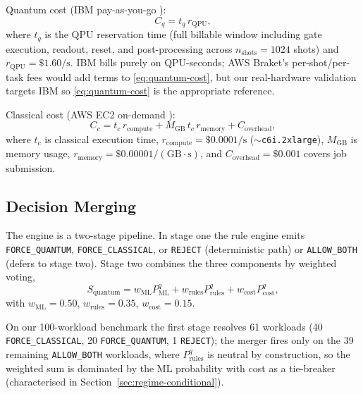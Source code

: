 \documentclass[10pt,conference]{IEEEtran}
\begin{document}
Quantum cost (IBM pay-as-you-go \cite{ibm_pricing2024}):
\begin{equation}
C_q = t_q\, r_{\text{QPU}},
\label{eq:quantum-cost}
\end{equation}
where $t_q$ is the QPU reservation time (full billable window including gate execution, readout, reset, and post-processing across $n_{\text{shots}}{=}1024$ shots) and $r_{\text{QPU}}{=}\$1.60/\text{s}$. IBM bills purely on QPU-seconds; AWS Braket's per-shot/per-task fees would add terms to \eqref{eq:quantum-cost}, but our real-hardware validation targets IBM so \eqref{eq:quantum-cost} is the appropriate reference.

Classical cost (AWS EC2 on-demand \cite{aws_ec2_pricing2024}):
\begin{equation}
C_c = t_c\, r_{\text{compute}} + M_{\text{GB}}\, t_c\, r_{\text{memory}} + C_{\text{overhead}},
\label{eq:classical-cost}
\end{equation}
where $t_c$ is classical execution time, $r_{\text{compute}}{=}\$0.0001/\text{s}$ ($\sim$\texttt{c6i.2xlarge}), $M_{\text{GB}}$ is memory usage, $r_{\text{memory}}{=}\$0.00001/(\text{GB}{\cdot}\text{s})$, and $C_{\text{overhead}}{=}\$0.001$ covers job submission.

\subsection{Decision Merging}

The engine is a two-stage pipeline. In stage one the rule engine emits \texttt{FORCE\_QUANTUM}, \texttt{FORCE\_CLASSICAL}, or \texttt{REJECT} (deterministic path) or \texttt{ALLOW\_BOTH} (defers to stage two). Stage two combines the three components by weighted voting,
\begin{equation}
S_{\text{quantum}} = w_{\text{ML}} P_{\text{ML}}^{q} + w_{\text{rules}} P_{\text{rules}}^{q} + w_{\text{cost}} P_{\text{cost}}^{q},
\label{eq:decision-score}
\end{equation}
with $w_{\text{ML}}{=}0.50$, $w_{\text{rules}}{=}0.35$, $w_{\text{cost}}{=}0.15$.

On our 100-workload benchmark the first stage resolves 61 workloads (40 \texttt{FORCE\_CLASSICAL}, 20 \texttt{FORCE\_QUANTUM}, 1 \texttt{REJECT}); the merger fires only on the 39 remaining \texttt{ALLOW\_BOTH} workloads, where $P_{\text{rules}}^{q}$ is neutral by construction, so the weighted sum is dominated by the ML probability with cost as a tie-breaker (characterised in Section~\ref{sec:regime-conditional}).
\end{document}

